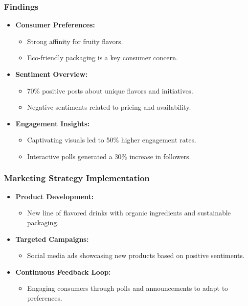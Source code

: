 \documentclass{beamer}
\begin{document}
\begin{frame}[fragile]
    \frametitle{Findings}
    \begin{itemize}
        \item \textbf{Consumer Preferences:}
            \begin{itemize}
                \item Strong affinity for fruity flavors.
                \item Eco-friendly packaging is a key consumer concern.
            \end{itemize}
        
        \item \textbf{Sentiment Overview:}
            \begin{itemize}
                \item 70\% positive posts about unique flavors and initiatives.
                \item Negative sentiments related to pricing and availability.
            \end{itemize}
        
        \item \textbf{Engagement Insights:}
            \begin{itemize}
                \item Captivating visuals led to 50\% higher engagement rates.
                \item Interactive polls generated a 30\% increase in followers.
            \end{itemize}
    \end{itemize}
\end{frame}

\begin{frame}[fragile]
    \frametitle{Marketing Strategy Implementation}
    \begin{itemize}
        \item \textbf{Product Development:}
            \begin{itemize}
                \item New line of flavored drinks with organic ingredients and sustainable packaging.
            \end{itemize}
        
        \item \textbf{Targeted Campaigns:}
            \begin{itemize}
                \item Social media ads showcasing new products based on positive sentiments.
            \end{itemize}
        
        \item \textbf{Continuous Feedback Loop:}
            \begin{itemize}
                \item Engaging consumers through polls and announcements to adapt to preferences.
            \end{itemize}
    \end{itemize}
\end{frame}
\end{document}
